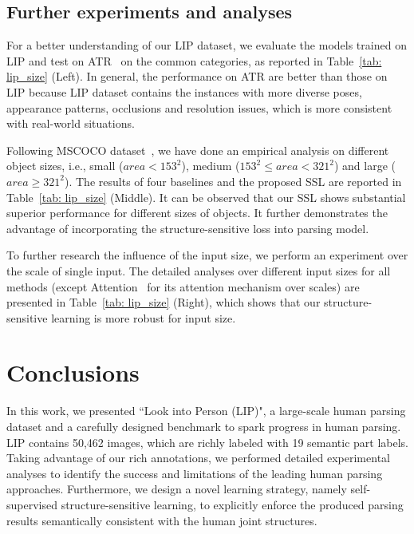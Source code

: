 \documentclass[10pt,twocolumn,letterpaper]{article}
\begin{document}
\subsection{Further experiments and analyses}
For a better understanding of our LIP dataset, we evaluate the models trained on LIP and test on ATR~\cite{Co-CNN} on the common categories, as reported in Table~\ref{tab: lip_size} (Left). In general, the performance on ATR are better than those on LIP because LIP dataset contains the instances with more diverse poses, appearance patterns, occlusions and resolution issues, which is more consistent with real-world situations. 

Following MSCOCO dataset~\cite{DBLP:journals/corr/LinMBHPRDZ14}, we have done an empirical analysis on different object sizes, i.e., small ($area < 153^2$), medium ($153^2 \leq area < 321^2$) and large ($area \geq 321^2$). The results of four baselines and the proposed SSL are reported in Table~\ref{tab: lip_size} (Middle). It can be observed that our SSL shows substantial superior performance for different sizes of objects. It further demonstrates the advantage of incorporating the structure-sensitive loss into parsing model.

To further research the influence of the input size, we perform an experiment over the scale of single input. The detailed analyses over different input sizes for all methods (except Attention~\cite{chen2015attention} for its attention mechanism over scales) are presented in Table~\ref{tab: lip_size} (Right), which shows that our structure-sensitive learning is more robust for input size.


\section{Conclusions}
In this work, we presented ``Look into Person (LIP)", a large-scale human parsing dataset and a carefully designed benchmark to spark progress in human parsing. LIP contains 50,462 images, which are richly labeled with 19 semantic part labels. Taking advantage of our rich annotations, we performed detailed experimental analyses to identify the success and limitations of the leading human parsing approaches. Furthermore, we design a novel learning strategy, namely self-supervised structure-sensitive learning, to explicitly enforce the produced parsing results semantically consistent with the human joint structures. 



{\small


}
\end{document}
